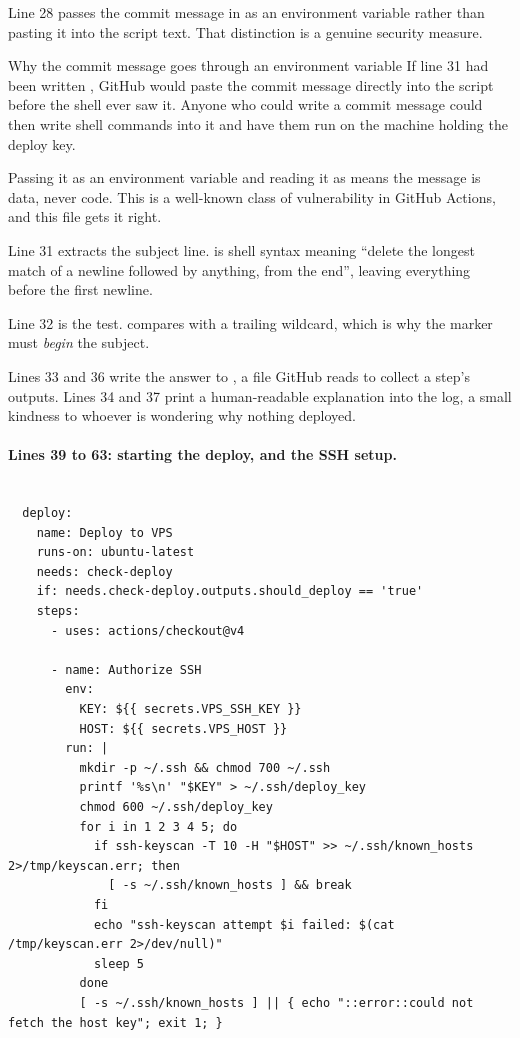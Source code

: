 Line 28 passes the commit message in as an environment variable rather than pasting
it into the script text. That distinction is a genuine security measure.

\begin{keyidea}{Why the commit message goes through an environment variable}
If line 31 had been written , GitHub would paste the commit message
directly into the script before the shell ever saw it. Anyone who could write a
commit message could then write shell commands into it and have them run on the
machine holding the deploy key.

Passing it as an environment variable and reading it as  means
the message is data, never code. This is a well-known class of vulnerability in
GitHub Actions, and this file gets it right.
\end{keyidea}

Line 31 extracts the subject line. 
is shell syntax meaning ``delete the longest match of a newline followed by
anything, from the end'', leaving everything before the first newline.

Line 32 is the test.  compares with a trailing
wildcard, which is why the marker must \emph{begin} the subject.

Lines 33 and 36 write the answer to , a file GitHub reads to
collect a step's outputs. Lines 34 and 37 print a human-readable explanation into
the log, a small kindness to whoever is wondering why nothing deployed.

\paragraph{Lines 39 to 63: starting the deploy, and the SSH setup.}

\begin{lstlisting}[firstnumber=39,caption={\file{deploy.yml.disabled}, lines 39--63}]

  deploy:
    name: Deploy to VPS
    runs-on: ubuntu-latest
    needs: check-deploy
    if: needs.check-deploy.outputs.should_deploy == 'true'
    steps:
      - uses: actions/checkout@v4

      - name: Authorize SSH
        env:
          KEY: ${{ secrets.VPS_SSH_KEY }}
          HOST: ${{ secrets.VPS_HOST }}
        run: |
          mkdir -p ~/.ssh && chmod 700 ~/.ssh
          printf '%s\n' "$KEY" > ~/.ssh/deploy_key
          chmod 600 ~/.ssh/deploy_key
          for i in 1 2 3 4 5; do
            if ssh-keyscan -T 10 -H "$HOST" >> ~/.ssh/known_hosts 2>/tmp/keyscan.err; then
              [ -s ~/.ssh/known_hosts ] && break
            fi
            echo "ssh-keyscan attempt $i failed: $(cat /tmp/keyscan.err 2>/dev/null)"
            sleep 5
          done
          [ -s ~/.ssh/known_hosts ] || { echo "::error::could not fetch the host key"; exit 1; }
\end{lstlisting}

